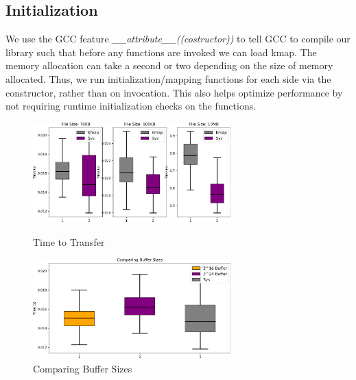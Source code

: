 \subsection{Initialization}\label{subsec:initialization}
We use the GCC feature \textit{\_\_attribute\_\_((costructor))} to tell GCC to compile our library such that before any functions are invoked we can load kmap.
The memory allocation can take a second or two depending on the size of memory allocated.
Thus, we run initialization/mapping functions for each side via the constructor, rather than on invocation.
This also helps optimize performance by not requiring runtime initialization checks on the functions.

\begin{figure}[!htb]
    \begin{minipage}{0.5\textwidth}
        \centering
        \includegraphics[keepaspectratio=true,width=3in]{figures/evaluation/results.png}
        \caption{Time to Transfer}
        \label{fig:results}
    \end{minipage}%
    \begin{minipage}{0.5\textwidth}
        \centering
        \includegraphics[keepaspectratio=true,width=3in]{figures/evaluation/buf_compare.png}
        \caption{Comparing \sysname Buffer Sizes}
        \label{fig:buf}
    \end{minipage}%
\end{figure}
